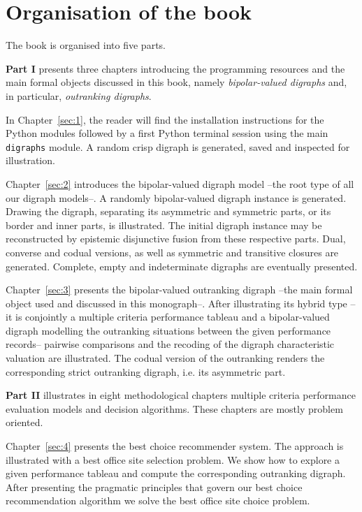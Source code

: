 \section*{Organisation of the book}
\label{sec:0.2}

The book is organised into five parts.
\vspace{0.5cm}

\textbf{Part I} presents three chapters introducing the \Digraph programming resources and the main formal objects discussed in this book, namely \emph{bipolar-valued digraphs} and, in particular, \emph{outranking digraphs}.

In Chapter~\vref{sec:1}, the reader will find the installation instructions for the \Digraph Python modules followed by a first Python terminal session using the main \texttt{digraphs} module. A random crisp digraph is generated, saved and inspected for illustration.

Chapter~\vref{sec:2} introduces the bipolar-valued digraph model --the root type of all our digraph models--. A randomly bipolar-valued digraph instance is generated. Drawing the digraph, separating its asymmetric and symmetric parts, or its border and inner parts, is illustrated. The initial digraph instance may be reconstructed by epistemic disjunctive fusion from these respective parts. Dual, converse and codual versions, as well as symmetric and transitive closures are generated. Complete, empty and indeterminate digraphs are eventually presented.

Chapter~\vref{sec:3} presents the bipolar-valued outranking digraph --the main formal object used and discussed in this monograph--. After illustrating its hybrid type --it is conjointly a multiple criteria performance tableau and a bipolar-valued digraph modelling the outranking situations between the given performance records-- pairwise comparisons and the recoding of the digraph characteristic valuation are illustrated. The codual version of the outranking renders the corresponding strict outranking digraph, i.e. its asymmetric part. 
\vspace{0.5cm}

\textbf{Part II} illustrates in eight methodological chapters multiple criteria performance evaluation models and decision algorithms. These chapters are mostly problem oriented.

Chapter~\vref{sec:4} presents the \Rubis best choice recommender system. The approach is illustrated with a best office site selection problem. We show how to explore a given performance tableau and compute the corresponding outranking digraph. After presenting the pragmatic principles that govern our best choice recommendation algorithm we solve the best office site choice problem.

